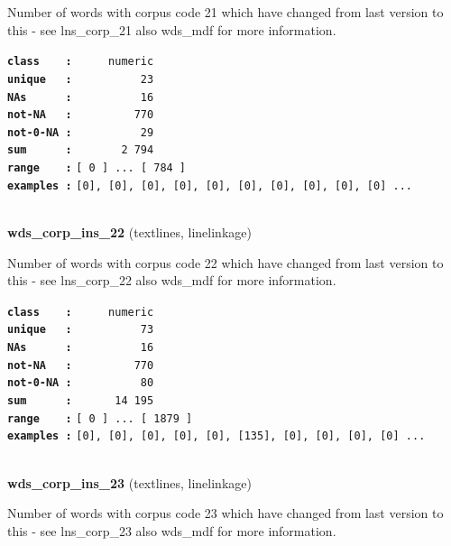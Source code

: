 \documentclass[]{article}
\begin{document}
Number of words with corpus code 21 which have changed from last version
to this - see lns\_corp\_21 also wds\_mdf for more information.

\textbf{\texttt{class\ \ \ \ :}} \texttt{~~~~~numeric}\\
\textbf{\texttt{unique\ \ \ :}} \texttt{~~~~~~~~~~23}\\
\textbf{\texttt{NAs\ \ \ \ \ \ :}} \texttt{~~~~~~~~~~16}\\
\textbf{\texttt{not-NA\ \ \ :}} \texttt{~~~~~~~~~770}\\
\textbf{\texttt{not-0-NA\ :}} \texttt{~~~~~~~~~~29}\\
\textbf{\texttt{sum\ \ \ \ \ \ :}} \texttt{~~~~~~~2~794}\\
\textbf{\texttt{range\ \ \ \ :}}
\texttt{{[}\ 0\ {]}\ ...\ {[}\ 784\ {]}}\\
\textbf{\texttt{examples\ :}}
\texttt{{[}0{]},\ {[}0{]},\ {[}0{]},\ {[}0{]},\ {[}0{]},\ {[}0{]},\ {[}0{]},\ {[}0{]},\ {[}0{]},\ {[}0{]}\ ...}\\

~

\textbf{wds\_corp\_ins\_22} (textlines, linelinkage)

Number of words with corpus code 22 which have changed from last version
to this - see lns\_corp\_22 also wds\_mdf for more information.

\textbf{\texttt{class\ \ \ \ :}} \texttt{~~~~~numeric}\\
\textbf{\texttt{unique\ \ \ :}} \texttt{~~~~~~~~~~73}\\
\textbf{\texttt{NAs\ \ \ \ \ \ :}} \texttt{~~~~~~~~~~16}\\
\textbf{\texttt{not-NA\ \ \ :}} \texttt{~~~~~~~~~770}\\
\textbf{\texttt{not-0-NA\ :}} \texttt{~~~~~~~~~~80}\\
\textbf{\texttt{sum\ \ \ \ \ \ :}} \texttt{~~~~~~14~195}\\
\textbf{\texttt{range\ \ \ \ :}}
\texttt{{[}\ 0\ {]}\ ...\ {[}\ 1879\ {]}}\\
\textbf{\texttt{examples\ :}}
\texttt{{[}0{]},\ {[}0{]},\ {[}0{]},\ {[}0{]},\ {[}0{]},\ {[}135{]},\ {[}0{]},\ {[}0{]},\ {[}0{]},\ {[}0{]}\ ...}\\

~

\textbf{wds\_corp\_ins\_23} (textlines, linelinkage)

Number of words with corpus code 23 which have changed from last version
to this - see lns\_corp\_23 also wds\_mdf for more information.
\end{document}
